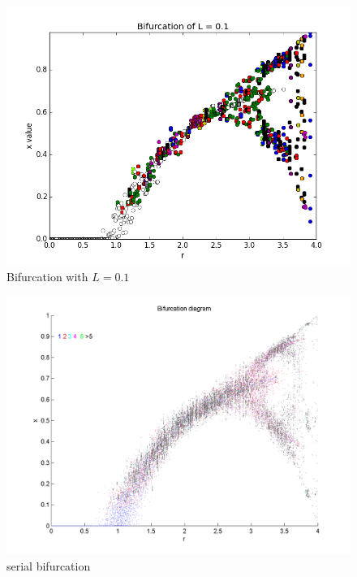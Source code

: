 \documentclass[12pt]{article}
\begin{document}
\begin{figure}[H]
	\begin{center}
		\includegraphics[scale=0.5]{Bifurcation_L1}
\caption{Bifurcation with $L=0.1$}\label{lb_bif}
	\end{center}
\end{figure}
\begin{figure}[H]
	\begin{center}
		\includegraphics[scale=0.5]{bif}
\caption{serial bifurcation}\label{serial_bif}
	\end{center}
\end{figure}
\end{document}
